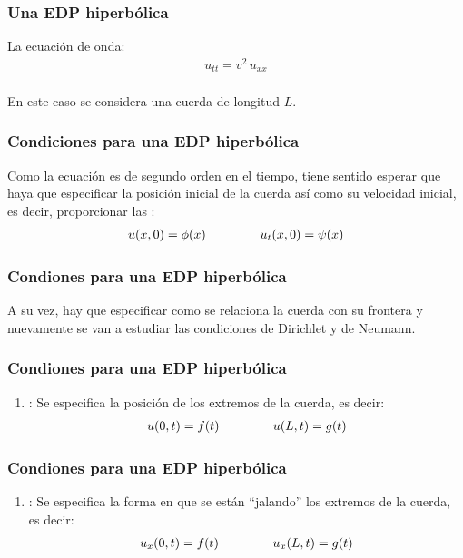 \documentclass[12pt]{beamer}
\begin{document}
\begin{frame}
\frametitle{Una EDP hiperbólica}
La ecuación de onda:
\pause
\begin{align*}
u_{tt} = v^{2} \, u_{xx}
\end{align*}
\\
\bigskip
\pause
En este caso se considera una cuerda de longitud $L$.
\end{frame}
\begin{frame}
\frametitle{Condiciones para una EDP hiperbólica}
Como la ecuación es de segundo orden en el tiempo, tiene sentido esperar que haya que especificar la posición inicial de la cuerda así como su velocidad inicial, es decir, proporcionar las :
\pause
\begin{align}
u (x, 0) = \phi (x) \hspace{1.5cm} u_{t} (x, 0) = \psi (x)
\label{eq:ecuacion_06_02_07}
\end{align}
\end{frame}
\begin{frame}
\frametitle{Condiones para una EDP hiperbólica}
A su vez, hay que especificar como se relaciona la cuerda con su frontera y nuevamente se van a estudiar las condiciones de Dirichlet y de Neumann.
\end{frame}
\begin{frame}
\frametitle{Condiones para una EDP hiperbólica}
\begin{enumerate}[<+->]
\item {}: Se especifica la posición de los extremos de la cuerda, es decir:
\begin{align}
u(0, t) = f (t) \hspace{1.5cm} u(L, t) = g(t)
\label{eq:ecuacion_06_02_08}   
\end{align}
\seti
\end{enumerate}
\end{frame}
\begin{frame}
\frametitle{Condiones para una EDP hiperbólica}
\begin{enumerate}[<+->]
\conti    
\item {}: Se especifica la forma en que se están \enquote{jalando} los extremos de la cuerda, es decir:
\begin{align}
u_{x} (0, t) = f (t) \hspace{1.5cm} u_{x} (L, t) = g (t)
\label{eq:ecuacion_06_02_09}    
\end{align}
\end{enumerate}
\end{frame}
\end{document}
